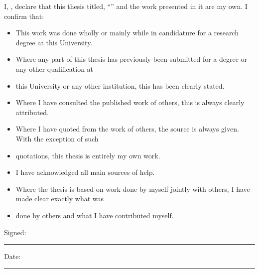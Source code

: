 \documentclass[
11pt, %
english, %
doublespacing, %
nolistspacing, %
parskip, %
headsepline, %
the default layout
]{MastersDoctoralThesis} %
\begin{document}
\hypersetup{citecolor=refC}
\hypersetup{linkcolor=refC}
\begin{declaration}
	\addchaptertocentry{\authorshipname} %
	\noindent I, \authorname, declare that this thesis titled, \enquote{\ttitle} and the work presented in it are my
	own. I confirm that:

	\begin{itemize}
		\item This work was done wholly or mainly while in candidature for a research degree at this University.
		\item Where any part of this thesis has previously been submitted for a degree or any other qualification at
		\item this University or any other institution, this has been clearly stated.
		\item Where I have consulted the published work of others, this is always clearly attributed.
		\item Where I have quoted from the work of others, the source is always given. With the exception of such
		\item quotations, this thesis is entirely my own work.
		\item I have acknowledged all main sources of help.
		\item Where the thesis is based on work done by myself jointly with others, I have made clear exactly what was
		\item done by others and what I have contributed myself.\\
	\end{itemize}

	\noindent Signed:\\
	\rule[0.5em]{25em}{0.5pt} %

	\noindent Date:\\
	\rule[0.5em]{25em}{0.5pt} %
\end{declaration}

\cleardoublepage

\end{document}
